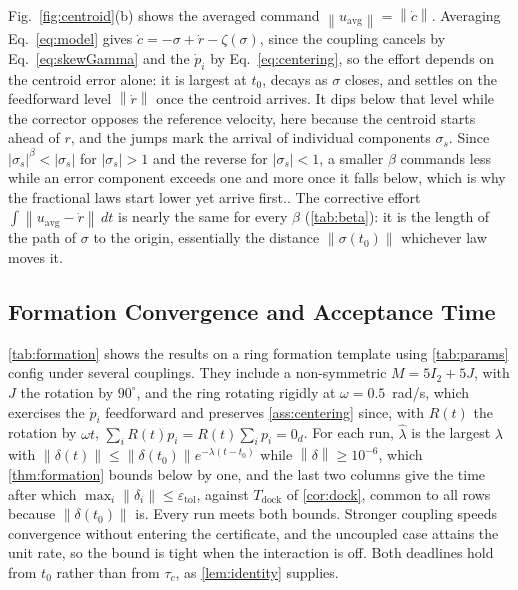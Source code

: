 \documentclass[letterpaper, 10 pt, conference]{ieeeconf}
\newcommand{\norm}[1]{\left\lVert #1 \right\rVert}
\newcommand{\abs}[1]{\left\lvert #1 \right\rvert}
\begin{document}
Fig.~\ref{fig:centroid}(b) shows the averaged command
$\norm{u_{\mathrm{avg}}}=\norm{\dot c}$. Averaging Eq.~\eqref{eq:model}
gives $\dot c=-\sigma+\dot r-\zeta(\sigma)$, since the coupling cancels
by Eq.~\eqref{eq:skewGamma} and the $\dot p_i$ by Eq.~\eqref{eq:centering}, so
the effort depends on the centroid error alone: it is largest at
$t_0$, decays as $\sigma$ closes, and settles on the feedforward level
$\norm{\dot r}$ once the centroid arrives. It dips below that level
while the corrector opposes the reference velocity, here because the
centroid starts ahead of $r$, and the jumps mark the arrival of
individual components $\sigma_s$. Since
$\abs{\sigma_s}^\beta<\abs{\sigma_s}$ for $\abs{\sigma_s}>1$ and the
reverse for $\abs{\sigma_s}<1$, a smaller $\beta$ commands less while an error
component exceeds one and more once it falls below, which is why the
fractional laws start lower yet arrive first.. The corrective effort
$\int\norm{u_{\mathrm{avg}}-\dot r}\,dt$ is nearly the same for every
$\beta$ (\cref{tab:beta}): it is the length of the path of $\sigma$ to the
origin, essentially the distance $\norm{\sigma(t_0)}$ whichever law
moves it.

\subsection{Formation Convergence and Acceptance Time}
\label{sec:num_formation}

\cref{tab:formation} shows the results on a  ring formation template using \cref{tab:params} config under several couplings. They include a
non-symmetric $M=5I_2+5J$, with $J$ the rotation by $90^\circ$, and the
ring rotating rigidly at $\omega=0.5$~rad/s, which exercises the
$\dot p_i$ feedforward and preserves \cref{ass:centering} since, with
$R(t)$ the rotation by $\omega t$, $\sum_iR(t)p_i=R(t)\sum_ip_i=0_d$. For each run, $\hat\lambda$ is the
largest $\lambda$ with
$\norm{\delta(t)}\le\norm{\delta(t_0)}e^{-\lambda(t-t_0)}$ while
$\norm{\delta}\ge10^{-6}$, which \cref{thm:formation} bounds below by
one, and the last two columns give the time after which
$\max_i\norm{\delta_i}\le\varepsilon_{\mathrm{tol}}$, against
$T_{\mathrm{dock}}$ of \cref{cor:dock}, common to all rows because
$\norm{\delta(t_0)}$ is. Every run meets both bounds. Stronger coupling
speeds convergence without
entering the certificate, and the uncoupled case attains the unit
rate, so the bound is tight when the interaction is off. Both
deadlines hold from $t_0$ rather than from $\tau_c$, as
\cref{lem:identity} supplies.
\end{document}
